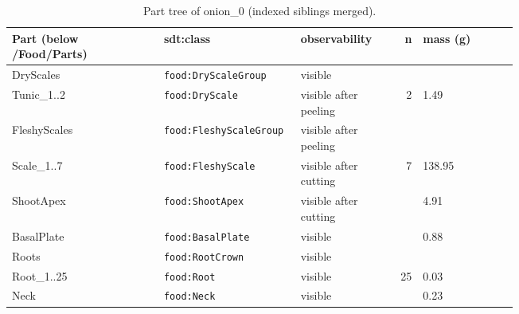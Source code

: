 \documentclass[10.5pt,a4paper]{article}
\begin{document}
\begin{table}[htbp]\centering\scriptsize\caption{Part tree of onion\_0 (indexed siblings merged).}
\begin{tabularx}{\linewidth}{@{}p{0.30\linewidth}p{0.27\linewidth}p{0.17\linewidth}rX@{}}\toprule Part (below /Food/Parts) & sdt:class & observability & n & mass (g) \\\midrule
\hspace*{0.0em}DryScales & \texttt{food:DryScaleGroup} & visible &  &  \\
\hspace*{0.9em}Tunic\_1..2 & \texttt{food:DryScale} & visible after peeling & 2 & 1.49 \\
\hspace*{0.0em}FleshyScales & \texttt{food:FleshyScaleGroup} & visible after peeling &  &  \\
\hspace*{0.9em}Scale\_1..7 & \texttt{food:FleshyScale} & visible after cutting & 7 & 138.95 \\
\hspace*{0.0em}ShootApex & \texttt{food:ShootApex} & visible after cutting &  & 4.91 \\
\hspace*{0.0em}BasalPlate & \texttt{food:BasalPlate} & visible &  & 0.88 \\
\hspace*{0.0em}Roots & \texttt{food:RootCrown} & visible &  &  \\
\hspace*{0.9em}Root\_1..25 & \texttt{food:Root} & visible & 25 & 0.03 \\
\hspace*{0.0em}Neck & \texttt{food:Neck} & visible &  & 0.23 \\\bottomrule\end{tabularx}\end{table}
\end{document}
